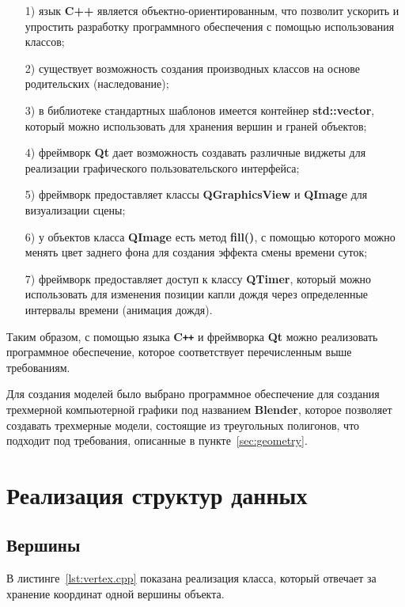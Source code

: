 \begin{enumerate}
\item[1)]
язык \textbf{C++} является объектно-ориентированным, что позволит ускорить и упростить разработку программного обеспечения с помощью использования классов;
\item[2)]
существует возможность создания производных классов на основе родительских (наследование);
\item[3)]
в библиотеке стандартных шаблонов имеется контейнер \textbf{std::vector}, который можно использовать для хранения вершин и граней объектов;
\item[4)]
фреймворк \textbf{Qt} дает возможность создавать различные виджеты для реализации графического пользовательского интерфейса;
\item[5)]
фреймворк предоставляет классы \textbf{QGraphicsView} и \textbf{QImage} для визуализации сцены;
\item[6)]
у объектов класса \textbf{QImage} есть метод \textbf{fill()}, с помощью которого можно менять цвет заднего фона для создания эффекта смены времени суток;
\item[7)]
фреймворк предоставляет доступ к классу \textbf{QTimer}, который можно использовать для изменения позиции капли дождя через определенные интервалы времени (анимация дождя).
\end{enumerate}

Таким образом, с помощью языка \textbf{C\texttt{++}} и фреймворка \textbf{Qt} можно реализовать программное обеспечение, которое соответствует перечисленным выше требованиям.

Для создания моделей было выбрано программное обеспечение для создания трехмерной компьютерной графики под названием \textbf{Blender}, которое позволяет создавать трехмерные модели, состоящие из треугольных полигонов, что подходит под требования, описанные в пункте~\ref{sec:geometry}.

\section{Реализация структур данных}

\subsection{Вершины}

В листинге~\ref{lst:vertex.cpp} показана реализация класса, который отвечает за хранение координат одной вершины объекта.

